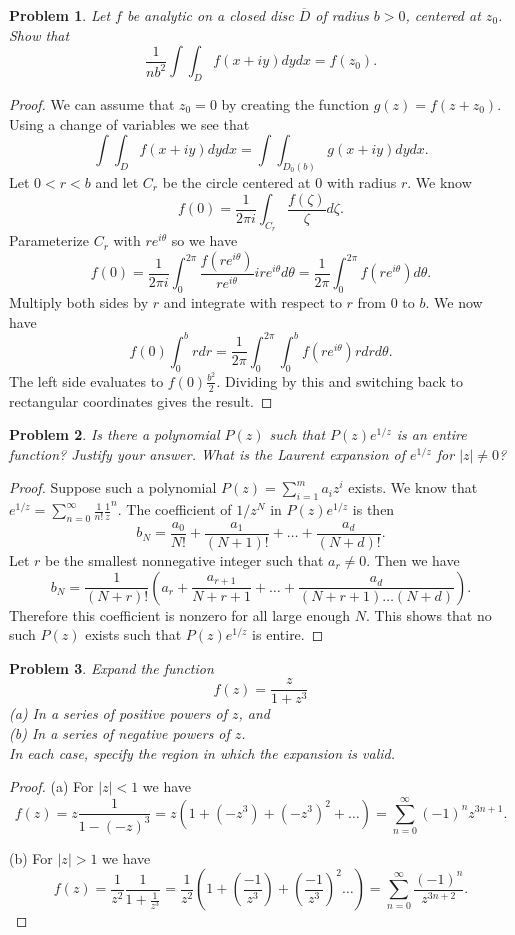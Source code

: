 \documentclass{article}
\newtheorem{problem}{Problem}
\begin{document}
\begin{problem}
Let $f$ be analytic on a closed disc $\overline{D}$ of radius $b > 0$, centered at $z_0$. Show that
\[
\frac{1}{nb^2} \int \int_D f(x+iy)dydx = f(z_0).
\]
\end{problem}
\begin{proof}
We can assume that $z_0 = 0$ by creating the function $g(z) = f(z+z_0)$. Using a change of variables we see that
\[
\int \int_D f(x+iy)dydx = \int \int_{D_0(b)} g(x+iy)dydx.
\]
Let $0 < r < b$ and let $C_r$ be the circle centered at $0$ with radius $r$. We know
\[
f(0) = \frac{1}{2 \pi i} \int_{C_r} \frac{f(\zeta)}{\zeta} d\zeta.
\]
Parameterize $C_r$ with $re^{i \theta}$ so we have
\[
f(0) = \frac{1}{2 \pi i} \int_{0}^{2 \pi} \frac{f(re^{i\theta})}{re^{i \theta}} ire^{i \theta} d \theta = \frac{1}{2 \pi} \int_{0}^{2 \pi} f(re^{i \theta}) d \theta.
\]
Multiply both sides by $r$ and integrate with respect to $r$ from $0$ to $b$. We now have
\[
f(0) \int_0^b r dr = \frac{1}{2 \pi} \int_{0}^{2 \pi} \int_0^b f(re^{i \theta}) r dr d \theta.
\]
The left side evaluates to $f(0) \frac{b^2}{2}$. Dividing by this and switching back to rectangular coordinates gives the result.
\end{proof}

\begin{problem}
Is there a polynomial $P(z)$ such that $P(z)e^{1/z}$ is an entire function? Justify your answer. What is the Laurent expansion of $e^{1/z}$ for $|z| \neq 0$?
\end{problem}
\begin{proof}
Suppose such a polynomial $P(z) = \sum_{i=1}^{m} a_iz^i$ exists. We know that $e^{1/z} = \sum_{n=0}^{\infty} \frac{1}{n!} \frac{1}{z}^n$. The coefficient of $1/z^N$ in $P(z)e^{1/z}$ is then
\[
b_N = \frac{a_0}{N!} + \frac{a_1}{(N+1)!} + \dots + \frac{a_d}{(N+d)!}.
\]
Let $r$ be the smallest nonnegative integer such that $a_r \neq 0$. Then we have
\[
b_N = \frac{1}{(N+r)!} \left ( a_r + \frac{a_{r+1}}{N+r+1} + \dots + \frac{a_d}{(N+r+1) \dots (N+d)} \right ).
\]
Therefore this coefficient is nonzero for all large enough $N$. This shows that no such $P(z)$ exists such that $P(z)e^{1/z}$ is entire.
\end{proof}

\begin{problem}
Expand the function
\[
f(z) = \frac{z}{1+z^3}
\]
(a) In a series of positive powers of $z$, and\\
(b) In a series of negative powers of $z$.\\
In each case, specify the region in which the expansion is valid.
\end{problem}
\begin{proof}
(a) For $|z| < 1$ we have
\[
f(z) = z \frac{1}{1 - (-z)^3} = z(1 + (-z^3) + (-z^3)^2 + \dots ) = \sum_{n=0}^{\infty} (-1)^n z^{3n+1}.
\]

(b) For $|z| > 1$ we have
\[
f(z) = \frac{1}{z^2} \frac{1}{1 + \frac{1}{z^3}} = \frac{1}{z^2} \left ( 1 + \left ( \frac{-1}{z^3} \right ) + \left ( \frac{-1}{z^3} \right )^2 \dots \right ) = \sum_{n=0}^{\infty} \frac{(-1)^n}{z^{3n+2}}.
\]
\end{proof}
\end{document}
